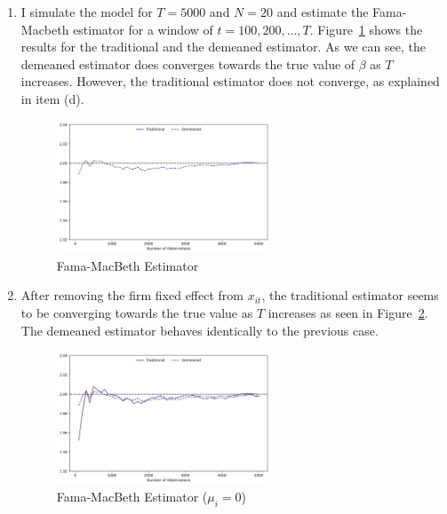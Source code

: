\begin{solution}
\begin{enumerate}[label = (\alph*)]
    \item I simulate the model for \(T = 5000\) and \(N = 20\) and estimate the Fama-Macbeth estimator for a window of \(t = 100, 200,  \dots, T\). Figure~\ref{fig:beta_fm_a} shows the results for the traditional and the demeaned estimator. As we can see, the demeaned estimator does converges towards the true value of \(\beta\) as \(T\) increases. However, the traditional estimator does not converge, as explained in item (d).
    \begin{figure}[!htbp]
        \centering
        \includegraphics[width=0.6\textwidth]{../../images/beta_fm_a}
        \caption{Fama-MacBeth Estimator}
        \label{fig:beta_fm_a}
    \end{figure}

    \item  After removing the firm fixed effect from \(x_{it}\), the traditional estimator seems to be converging towards the true value as \(T\) increases as seen in Figure~\ref{fig:beta_fm_b}. The demeaned estimator behaves identically to the previous case.
    \begin{figure}[!htbp]
        \centering
        \includegraphics[width=0.6\textwidth]{../../images/beta_fm_b}
        \caption{Fama-MacBeth Estimator (\(\mu_i = 0\))}
        \label{fig:beta_fm_b}
    \end{figure}        


\end{enumerate}
\end{solution}
